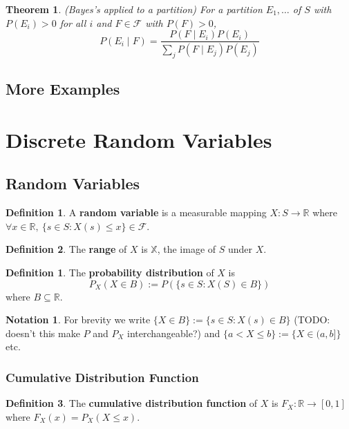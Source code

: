 \documentclass[12pt]{article}
\newtheorem{thm}{Theorem}[section]
\theoremstyle{definition}
\newtheorem{defn}{Definition}[subsection]
\newtheorem*{defn*}{Definition}
\newtheorem*{not*}{Notation}
\newcommand{\R}{\mathbb{R}}
\newcommand{\F}{\mathcal{F}}
\newcommand{\X}{\mathbb{X}}
\begin{document}
\begin{thm}
  (Bayes's applied to a partition)
  For a partition $E_1, \ldots$ of $S$ with $P(E_i) > 0$ for all $i$ and $F \in \F$ with $P(F) > 0$,
  $$P(E_i \mid F) = \frac{P(F \mid E_i)P(E_i)}{\sum_jP(F \mid E_j)P(E_j)}$$
\end{thm}


\subsection{More Examples}

\section{Discrete Random Variables}

\subsection{Random Variables}

\begin{defn}
  A \textbf{random variable} is a measurable mapping $X : S \to \R$ where $\forall x \in \R,\ \{s \in S : X(s) \leq x\} \in \F$.
\end{defn}

\begin{defn}
  The \textbf{range} of $X$ is $\X$, the image of $S$ under $X$.
\end{defn}

\begin{defn*}
  The \textbf{probability distribution} of $X$ is
  $$P_X(X \in B) := P(\{s \in S : X(S) \in B\})$$
  where $B \subseteq \R$.
\end{defn*}

\begin{not*}
  For brevity we write $\{X \in B\} := \{s \in S : X(s) \in B\}$ (TODO: doesn't this make $P$ and $P_X$ interchangeable?) and $\{a < X \leq b\} := \{X \in (a, b]\}$ etc.
\end{not*}

\subsubsection{Cumulative Distribution Function}

\begin{defn}
  The \textbf{cumulative distribution function} of $X$ is $F_X : \R \to [0, 1]$ where $F_X(x) = P_X(X \leq x)$.
\end{defn}
\end{document}
